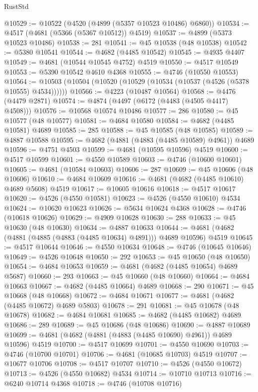 \begin{lexlean}{RustStd}
\begin{coremodule}
@10529 := @10522 (@4520 (@4899 (@5357 @10523 @10486) @6860))
@10534 := @4517 (@4681 (@5366 (@5367 @10512)) @4519)
@10537 := @4899 (@5373 @10523 @10486)
@10538 := 281
@10541 := @45 @10538 (@48 @10538)
@10542 := @5380 @10541
@10544 := @4682 (@4485 @10542)
@10545 := @4935 @4407
@10549 := @4681 (@10544 @10545 @4752) @4519
@10550 := @4517 @10549
@10553 := @5390 @10542 @4610 @4368
@10555 := @4746 (@10550 @10553)
@10564 := @10503 (@10504 (@10520 (@10529 (@10534 (@10537 (@4526 (@5378 @10555) @4534))))))
@10566 := @4223 (@10487 @10564)
@10568 := @4476 (@4479 @2871)
@10574 := @4874 (@4497 (@6172 (@4483 (@4505 @4417) @4508)))
@10576 := @10568 @10574 @10486
@10577 := 286
@10580 := @45 @10577 (@48 @10577)
@10581 := @4684 @10580
@10584 := @4682 (@4485 @10581) @4689
@10585 := 285
@10588 := @45 @10585 (@48 @10585)
@10589 := @4887 @10588
@10595 := @4682 (@4881 (@4883 (@4485 @10589) @4961)) @4689
@10596 := @4751 @4503
@10599 := @4681 (@10595 @10596) @4519
@10600 := @4517 @10599
@10601 := @4550 @10589
@10603 := @4746 (@10600 @10601)
@10605 := @4681 (@10584 @10603)
@10606 := 287
@10609 := @45 @10606 (@48 @10606)
@10610 := @4684 @10609
@10616 := @4681 (@4682 (@4485 @10610) @4689 @5608) @4519
@10617 := @10605 @10616
@10618 := @4517 @10617
@10620 := @4526 (@4550 @10581)
@10623 := @4526 (@4550 @10610) @4534
@10624 := @10620 @10623
@10626 := @5634 @10624 @4368
@10628 := @4746 (@10618 @10626)
@10629 := @4909 @10628
@10630 := 288
@10633 := @45 @10630 (@48 @10630)
@10634 := @4887 @10633
@10644 := @4681 (@4682 (@4881 (@4885 (@4883 (@4485 @10634) @4891))) @4689 @10596) @4519
@10645 := @4517 @10644
@10646 := @4550 @10634
@10648 := @4746 (@10645 @10646)
@10649 := @4526 @10648
@10650 := 292
@10653 := @45 @10650 (@48 @10650)
@10654 := @4684 @10653
@10659 := @4681 (@4682 (@4485 @10654) @4689 @5687)
@10660 := 293
@10663 := @45 @10660 (@48 @10660)
@10664 := @4684 @10663
@10667 := @4682 (@4485 @10664) @4689
@10668 := 290
@10671 := @45 @10668 (@48 @10668)
@10672 := @4684 @10671
@10677 := @4681 (@4682 (@4485 @10672) @4689 @5803)
@10678 := 291
@10681 := @45 @10678 (@48 @10678)
@10682 := @4684 @10681
@10685 := @4682 (@4485 @10682) @4689
@10686 := 289
@10689 := @45 @10686 (@48 @10686)
@10690 := @4887 @10689
@10699 := @4681 (@4682 (@4881 (@4883 (@4485 @10690) @4961)) @4689 @10596) @4519
@10700 := @4517 @10699
@10701 := @4550 @10690
@10703 := @4746 (@10700 @10701)
@10706 := @4681 (@10685 @10703) @4519
@10707 := @10677 @10706
@10708 := @4517 @10707
@10710 := @4526 (@4550 @10672)
@10713 := @4526 (@4550 @10682) @4534
@10714 := @10710 @10713
@10716 := @6240 @10714 @4368
@10718 := @4746 (@10708 @10716)

\end{coremodule}
\end{lexlean}
